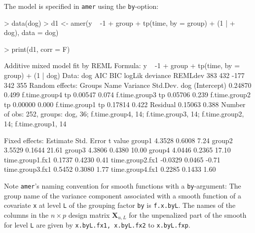 \documentclass[12pt]{article}
\newenvironment{Schunk}{}{}
\newcommand{\code}[1]{\texttt{\small{#1}}}
\begin{document}
The model is specified in \code{amer} using the \code{by}-option:
\begin{Schunk}
\begin{Sinput}
> data(dog)
> d1 <- amer(y ~ -1 + group + tp(time, by = group) + (1 | 
+     dog), data = dog)
\end{Sinput}
\end{Schunk}
\begin{Schunk}
\begin{Sinput}
> print(d1, corr = F)
\end{Sinput}
\begin{Soutput}
Additive mixed model fit by REML 
Formula: y ~ -1 + group + tp(time, by = group) + (1 | dog) 
   Data: dog 
 AIC BIC logLik deviance REMLdev
 383 432   -177      342     355
Random effects:
 Groups        Name        Variance Std.Dev.
 dog           (Intercept) 0.24870  0.499   
 f.time.group4 tp          0.00547  0.074   
 f.time.group3 tp          0.05706  0.239   
 f.time.group2 tp          0.00000  0.000   
 f.time.group1 tp          0.17814  0.422   
 Residual                  0.15063  0.388   
Number of obs: 252, groups: dog, 36; f.time.group4, 14; f.time.group3, 14; f.time.group2, 14; f.time.group1, 14

Fixed effects:
                Estimate Std. Error t value
group1            4.3528     0.6008    7.24
group2            3.5529     0.1644   21.61
group3            4.3806     0.4380   10.00
group4            4.0446     0.2365   17.10
time.group1.fx1   0.1737     0.4230    0.41
time.group2.fx1  -0.0329     0.0465   -0.71
time.group3.fx1   0.5452     0.3080    1.77
time.group4.fx1   0.2285     0.1433    1.60
\end{Soutput}
\end{Schunk}
Note \code{amer}'s naming convention for smooth functions with a
\code{by}-argument: The group name of the variance component associated with a
smooth function of a covariate \code{x} at level \code{L} of the grouping factor 
\code{by} is \code{f.x.byL}. The names of the columns in the $n \times p$ design
matrix $\bm X_{u, L}$ for the unpenalized part of the smooth for level \code{L}
are given by \code{x.byL.fx1, x.byL.fx2} to \code{x.byL.fxp}.
\end{document}
